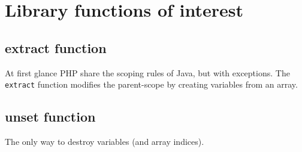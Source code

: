 \section{Library functions of interest}
\subsection{extract function}
At first glance PHP share the scoping rules of Java, but with exceptions. The \texttt{extract} function modifies the parent-scope by creating variables from an array. 

\subsection{unset function}
The only way to destroy variables (and array indices). 